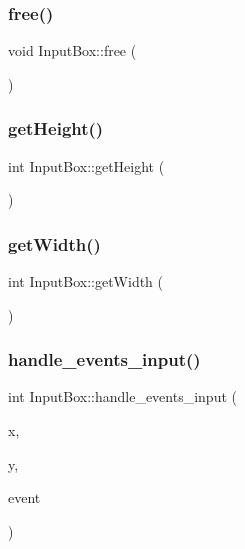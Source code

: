 \subsubsection{\texorpdfstring{free()}{free()}}
{\footnotesize\ttfamily void Input\+Box\+::free (\begin{DoxyParamCaption}{ }\end{DoxyParamCaption})}

\mbox{\label{class_input_box_a8c812e49244c0e602e19bd7924b8779e}} 
\subsubsection{\texorpdfstring{get\+Height()}{getHeight()}}
{\footnotesize\ttfamily int Input\+Box\+::get\+Height (\begin{DoxyParamCaption}{ }\end{DoxyParamCaption})}

\mbox{\label{class_input_box_a2b728710292ab4f2503d8fcf660e5c1a}} 
\subsubsection{\texorpdfstring{get\+Width()}{getWidth()}}
{\footnotesize\ttfamily int Input\+Box\+::get\+Width (\begin{DoxyParamCaption}{ }\end{DoxyParamCaption})}

\mbox{\label{class_input_box_a23ab41b0bda383c054c2b25257df47e8}} 
\subsubsection{\texorpdfstring{handle\+\_\+events\+\_\+input()}{handle\_events\_input()}}
{\footnotesize\ttfamily int Input\+Box\+::handle\+\_\+events\+\_\+input (\begin{DoxyParamCaption}\item[{int}]{x,  }\item[{int}]{y,  }\item[{S\+D\+L\+\_\+\+Event}]{event }\end{DoxyParamCaption})}

